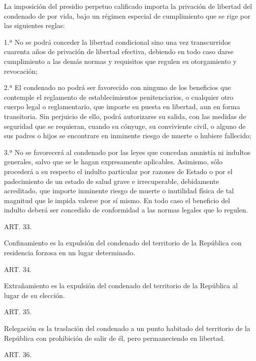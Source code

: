     La imposición del presidio perpetuo calificado importa la privación de libertad del condenado de por vida, bajo un régimen especial de cumplimiento que se rige por las siguientes reglas:

    1.ª No se podrá conceder la libertad condicional sino una vez transcurridos cuarenta años de privación de libertad efectiva, debiendo en todo caso darse cumplimiento a las demás normas y requisitos que regulen su otorgamiento y revocación;

    2.ª El condenado no podrá ser favorecido con ninguno de los beneficios que contemple el reglamento de establecimientos penitenciarios, o cualquier otro cuerpo legal o reglamentario, que importe su puesta en libertad, aun en forma transitoria. Sin perjuicio de ello, podrá autorizarse su salida, con las medidas de seguridad que se requieran, cuando su cónyuge, su conviviente civil, o alguno de sus padres o hijos se encontrare en inminente riesgo de muerte o hubiere fallecido;

    3.ª No se favorecerá al condenado por las leyes que concedan amnistía ni indultos generales, salvo que se le hagan expresamente aplicables. Asimismo, sólo procederá a su respecto el indulto particular por razones de Estado o por el padecimiento de un estado de salud grave e irrecuperable, debidamente acreditado, que importe inminente riesgo de muerte o inutilidad física de tal magnitud que le impida valerse por sí mismo. En todo caso el beneficio del indulto deberá ser concedido de conformidad a las normas legales que lo regulen.




    ART. 33.

    Confinamiento es la expulsión del condenado del territorio de la República con residencia forzosa en un lugar determinado.





    ART. 34.

    Extrañamiento es la expulsión del condenado del territorio de la República al lugar de su elección.





    ART. 35.

    Relegación es la traslación del condenado a un punto habitado del territorio de la República con prohibición de salir de él, pero permaneciendo en libertad.



    ART. 36.


